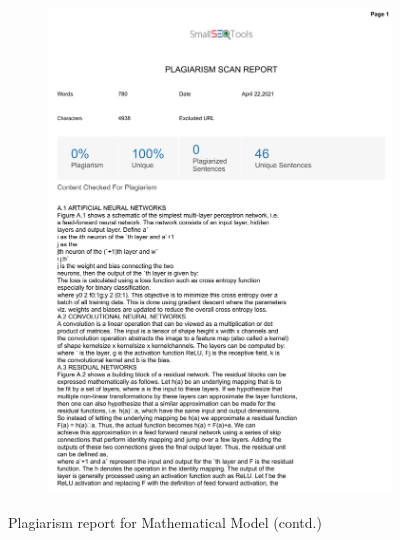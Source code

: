 \documentclass[oneside,a4paper,12pt]{report}
\begin{document}
\begin{appendices}
\begin{figure}
\begin{subfigure}[H]{\textwidth}
    	\includegraphics[scale=0.7, page=2]{plagiarism/mathematical_model.pdf}
    \end{subfigure}
    \caption{Plagiarism report for Mathematical Model (contd.)}
    \label{PlagiarismMath_1}
\end{figure}



\end{appendices}
\end{document}
